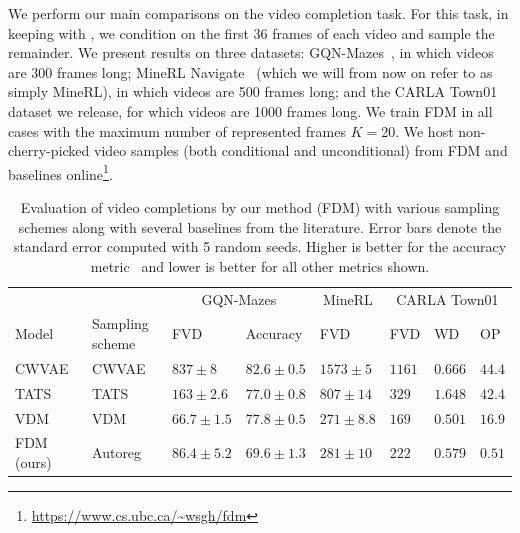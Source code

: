 We perform our main comparisons on the video completion task. For this task, in keeping with \citet{saxena2021clockwork}, we condition on the first 36 frames of each video and sample the remainder. We present results on three datasets: GQN-Mazes~\citep{eslami2018neural}, in which videos are 300 frames long; MineRL Navigate~\citep{guss2019minerl,saxena2021clockwork} (which we will from now on refer to as simply MineRL), in which videos are 500 frames long; and the CARLA Town01 dataset we release, for which videos are 1000 frames long. We train FDM in all cases with the maximum number of represented frames $K=20$. We host non-cherry-picked video samples (both conditional and unconditional) from FDM and baselines online\footnote{\url{https://www.cs.ubc.ca/~wsgh/fdm}}.


\begin{table}
  \scriptsize
  \caption{Evaluation of video completions by our method (FDM) with various sampling schemes along with several baselines from the literature. Error bars denote the standard error computed with 5 random seeds. Higher is better for the accuracy metric~\cite{saxena2021clockwork} and lower is better for all other metrics shown.}
  \label{tab:fdm-results-completion}
  \centering
  \begin{tabular}{llllllll}
    \toprule
    \multicolumn{1}{r}{} & & \multicolumn{2}{c}{GQN-Mazes}  & \multicolumn{1}{c}{MineRL}  & \multicolumn{3}{c}{CARLA Town01} \\
    \cmidrule(r){3-4} \cmidrule(r){5-5} \cmidrule(r){6-8}
    Model &  Sampling scheme        & FVD      & Accuracy  & FVD     &  FVD     & WD  & OP \\
    \midrule
    \multirow{1}{*}{CWVAE~\citep{saxena2021clockwork}}
    & CWVAE  & $837 \pm 8$      & $82.6 \pm 0.5$  & $1573 \pm 5$                 & $1161$          & $0.666$   & $44.4$        \\
    \midrule
    \multirow{1}{*}{TATS~\citep{ge2022long}}
    & TATS   & $163 \pm 2.6$  &  $77.0 \pm 0.8$  & $807 \pm 14$          & $329$          & $1.648$          & $42.4$ \\
    \midrule
    \multirow{1}{*}{VDM~\citep{ho2022video}}
    & VDM   & $66.7 \pm 1.5$  &  $77.8 \pm 0.5$  & $271 \pm 8.8$          & $169$          & $0.501$          & $16.9$ \\
    \midrule
    \multirow{5}{*}{FDM (ours)}
    &  Autoreg        & $86.4 \pm 5.2$          & $69.6 \pm 1.3$   & $281 \pm 10$          & $222$          & $0.579$      & $0.51$     \\

\end{tabular}
\end{table}
